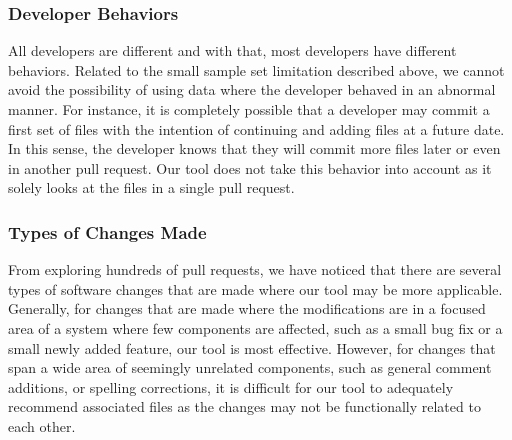 \subsubsection{Developer Behaviors}

All developers are different and with that, most developers have different behaviors. Related to the small sample set limitation described above, we cannot avoid the possibility of using data where the developer behaved in an abnormal manner. For instance, it is completely possible that a developer may commit a first set of files with the intention of continuing and adding files at a future date. In this sense, the developer knows that they will commit more files later or even in another pull request. Our tool does not take this behavior into account as it solely looks at the files in a single pull request.

\subsubsection{Types of Changes Made}

From exploring hundreds of pull requests, we have noticed that there are several types of software changes that are made where our tool may be more applicable. Generally, for changes that are made where the modifications are in a focused area of a system where few components are affected, such as a small bug fix or a small newly added feature, our tool is most effective. However, for changes that span a wide area of seemingly unrelated components, such as general comment additions, or spelling corrections, it is difficult for our tool to adequately recommend associated files as the changes may not be functionally related to each other.
